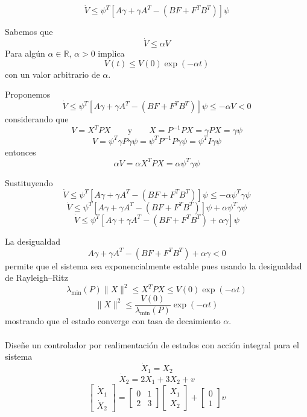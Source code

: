 \begin{flushright}
\end{flushright}

\[
  \dot{V}\leq
  \psi^{T}\left[A\gamma+\gamma A^{T}-(BF+F^{T}B^{T})\right]\psi
\]

Sabemos que
\[
  \dot{V}\leq\alpha V
\]
Para algún $\alpha\in\mathbb{R}$, $\alpha>0$ implica
\[
  V(t)\leq V(0)\exp(-\alpha t)
\]
con un valor arbitrario de $\alpha$.

Proponemos
\[
  \dot{V}\leq
  \psi^{T}\left[A\gamma+\gamma A^{T}-(BF+F^{T}B^{T})\right]\psi
  \leq-\alpha V<0
\]
considerando que
\[
  V=X^{T}PX
  \qquad\text{y}\qquad
  X=P^{-1}PX=\gamma PX=\gamma\psi
\]
\[
  V=\psi^{T}\gamma P\gamma\psi
  =\psi^{T}P^{-1}P\gamma\psi
  =\psi^{T}I\gamma\psi
\]
entonces
\[
  \alpha V=\alpha X^{T}PX=\alpha\psi^{T}\gamma\psi
\]

Sustituyendo
\[
  \dot{V}\leq
  \psi^{T}\left[A\gamma+\gamma A^{T}-(BF+F^{T}B^{T})\right]\psi
  \leq-\alpha\psi^{T}\gamma\psi
\]
\[
  \dot{V}\leq
  \psi^{T}\left[A\gamma+\gamma A^{T}-(BF+F^{T}B^{T})\right]\psi
  +\alpha\psi^{T}\gamma\psi
\]
\[
  \dot{V}\leq
  \psi^{T}\left[A\gamma+\gamma A^{T}-(BF+F^{T}B^{T})
  +\alpha\gamma\right]\psi
\]

La desigualdad
\[
  A\gamma+\gamma A^{T}-(BF+F^{T}B^{T})+\alpha\gamma<0
\]
permite que el sistema sea exponencialmente estable pues usando la desigualdad
de Rayleigh--Ritz
\[
  \lambda_{\min}(P)\lVert X\rVert^{2}
  \leq X^{T}PX
  \leq V(0)\exp(-\alpha t)
\]
\[
  \lVert X\rVert^{2}
  \leq\frac{V(0)}{\lambda_{\min}(P)}\exp(-\alpha t)
\]
mostrando que el estado converge con tasa de decaimiento $\alpha$.

\paragraph{}
Diseñe un controlador por realimentación de estados con acción integral para el sistema
\[
  \dot{X}_1=X_2
\]
\[
  \dot{X}_2=2X_1+3X_2+v
\]
\[
  \begin{bmatrix}
    \dot{X}_1\\
    \dot{X}_2
  \end{bmatrix}
  =
  \begin{bmatrix}
    0 & 1\\
    2 & 3
  \end{bmatrix}
  \begin{bmatrix}
    X_1\\
    X_2
  \end{bmatrix}
  +
  \begin{bmatrix}
    0\\
    1
  \end{bmatrix}v
\]
